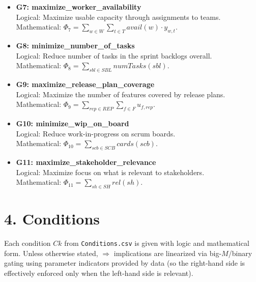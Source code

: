 \documentclass[11pt,a4paper]{article}
\begin{document}
\begin{itemize}[leftmargin=2em]
  \item \textbf{G7: maximize\_worker\_availability} \\
  Logical: Maximize usable capacity through assignments to teams. \\
  Mathematical: $\displaystyle \Phi_{7}=\sum_{w\in W}\sum_{t\in T} avail(w)\cdot y_{w,t}$.

  \item \textbf{G8: minimize\_number\_of\_tasks} \\
  Logical: Reduce number of tasks in the sprint backlogs overall. \\
  Mathematical: $\displaystyle \Phi_{8}=\sum_{sbl\in SBL} numTasks(sbl)$.

  \item \textbf{G9: maximize\_release\_plan\_coverage} \\
  Logical: Maximize the number of features covered by release plans. \\
  Mathematical: $\displaystyle \Phi_{9}=\sum_{rep\in REP}\sum_{f\in F} u_{f,rep}$.

  \item \textbf{G10: minimize\_wip\_on\_board} \\
  Logical: Reduce work-in-progress on scrum boards. \\
  Mathematical: $\displaystyle \Phi_{10}=\sum_{scb\in SCB} cards(scb)$.

  \item \textbf{G11: maximize\_stakeholder\_relevance} \\
  Logical: Maximize focus on what is relevant to stakeholders. \\
  Mathematical: $\displaystyle \Phi_{11}=\sum_{sh\in SH} rel(sh)$.
\end{itemize}

\section{4. Conditions}
\noindent
Each condition $Ck$ from \texttt{Conditions.csv} is given with logic and mathematical form. Unless otherwise stated, $\Rightarrow$ implications are linearized via big-$M$/binary gating using parameter indicators provided by data (so the right-hand side is effectively enforced only when the left-hand side is relevant).
\end{document}
